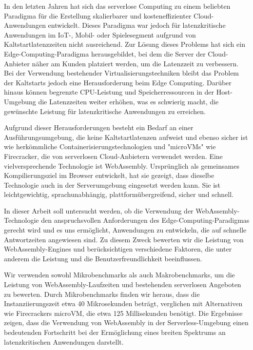 In den letzten Jahren hat sich das serverlose Computing zu einem beliebten Paradigma für die Erstellung skalierbarer und kosteneffizienter Cloud-Anwendungen entwickelt. Dieses Paradigma war jedoch für latenzkritische Anwendungen im IoT-, Mobil- oder Spielesegment aufgrund von Kaltstartlatenzzeiten nicht ausreichend. Zur Lösung dieses Problems hat sich ein Edge-Computing-Paradigma herausgebildet, bei dem die Server der Cloud-Anbieter näher am Kunden platziert werden, um die Latenzzeit zu verbessern. Bei der Verwendung bestehender Virtualisierungstechniken bleibt das Problem der Kaltstarts jedoch eine Herausforderung beim Edge Computing. Darüber hinaus können begrenzte CPU-Leistung und Speicherressourcen in der Host-Umgebung die Latenzzeiten weiter erhöhen, was es schwierig macht, die gewünschte Leistung für latenzkritische Anwendungen zu erreichen. 

Aufgrund dieser Herausforderungen besteht ein Bedarf an einer Ausführungsumgebung, die keine Kaltstartlatenzen aufweist und ebenso sicher ist wie herkömmliche Containerisierungstechnologien und "microVMs" wie Firecracker, die von serverlosen Cloud-Anbietern verwendet werden. Eine vielversprechende Technologie ist WebAssembly. Ursprünglich als gemeinsames Kompilierungsziel im Browser entwickelt, hat sie gezeigt, dass dieselbe Technologie auch in der Serverumgebung eingesetzt werden kann. Sie ist leichtgewichtig, sprachunabhängig, plattformübergreifend, sicher und schnell.

In dieser Arbeit soll untersucht werden, ob die Verwendung der WebAssembly-Technologie den anspruchsvollen Anforderungen des Edge-Computing-Paradigmas gerecht wird und es uns ermöglicht, Anwendungen zu entwickeln, die auf schnelle Antwortzeiten angewiesen sind. Zu diesem Zweck bewerten wir die Leistung von WebAssembly-Engines und berücksichtigen verschiedene Faktoren, die unter anderem die Leistung und die Benutzerfreundlichkeit beeinflussen. 

Wir verwenden sowohl Mikrobenchmarks als auch Makrobenchmarks, um die Leistung von \hbox{WebAssembly}-Laufzeiten und bestehenden serverlosen Angeboten zu bewerten. Durch Mikrobenchmarks finden wir heraus, dass die Instanziierungszeit etwa 40 Mikrosekunden beträgt, verglichen mit Alternativen wie Firecrackers microVM, die etwa 125 Millisekunden benötigt. Die Ergebnisse zeigen, dass die Verwendung von WebAssembly in der Serverless-Umgebung einen bedeutenden Fortschritt bei der Ermöglichung eines breiten Spektrums an latenzkritischen Anwendungen darstellt.
